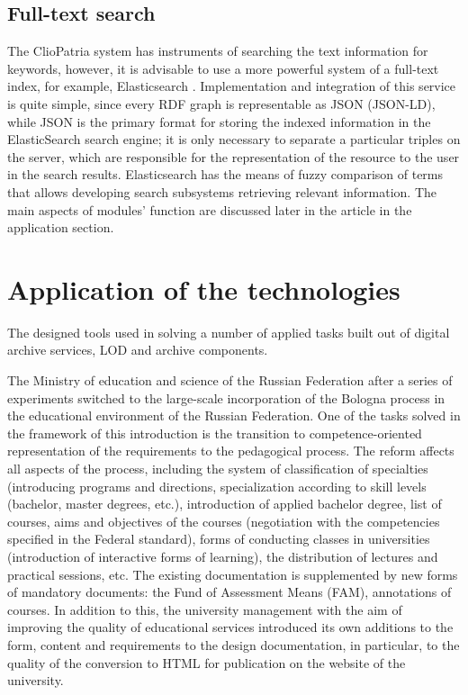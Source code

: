 \documentclass[12pt]{llncs}
\begin{document}
\subsection{Full-text search}

The ClioPatria system has instruments of searching the text information
for keywords, however, it is advisable to use a more powerful system of
a full-text index, for example, Elasticsearch \cite{b13}. Implementation
and integration of this service is quite simple, since every RDF graph
is representable as JSON (JSON-LD), while JSON is the primary format for
storing the indexed information in the ElasticSearch search engine; it
is only necessary to separate a particular triples on the server, which
are responsible for the representation of the resource to the user in
the search results. Elasticsearch has the means of fuzzy comparison of
terms that allows developing search subsystems retrieving relevant
information. The main aspects of modules' function are discussed later
in the article in the application section.

\section{Application of the technologies}

The designed tools used in solving a number of applied tasks built out
of digital archive services, LOD and archive components.

The Ministry of education and science of the Russian Federation after a
series of experiments switched to the large-scale incorporation of the
Bologna process in the educational environment of the Russian
Federation. One of the tasks solved in the framework of this
introduction is the transition to competence-oriented representation of
the requirements to the pedagogical process. The reform affects all
aspects of the process, including the system of classification of
specialties (introducing programs and directions, specialization
according to skill levels (bachelor, master degrees, etc.), introduction
of applied bachelor degree, list of courses, aims and objectives of the
courses (negotiation with the competencies specified in the Federal
standard), forms of conducting classes in universities (introduction of
interactive forms of learning), the distribution of lectures and
practical sessions, etc. The existing documentation is supplemented by
new forms of mandatory documents: the Fund of Assessment Means (FAM),
annotations of courses. In addition to this, the university management
with the aim of improving the quality of educational services introduced
its own additions to the form, content and requirements to the design
documentation, in particular, to the quality of the conversion to HTML
for publication on the website of the university.
\end{document}
